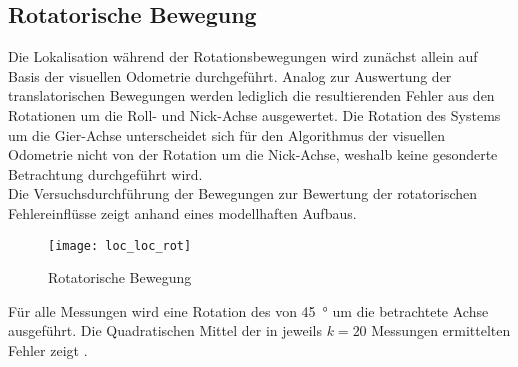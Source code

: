\subsection{Rotatorische Bewegung}

Die Lokalisation während der Rotationsbewegungen wird zunächst allein auf Basis der visuellen Odometrie durchgeführt. Analog zur Auswertung der translatorischen Bewegungen werden lediglich die resultierenden Fehler aus den Rotationen um die Roll- und Nick-Achse ausgewertet. Die Rotation des Systems um die Gier-Achse unterscheidet sich für den Algorithmus der visuellen Odometrie nicht von der Rotation um die Nick-Achse, weshalb keine gesonderte Betrachtung durchgeführt wird.\\
Die Versuchsdurchführung der Bewegungen zur Bewertung der rotatorischen Fehlereinflüsse zeigt  anhand eines modellhaften Aufbaus.\\


\begin{figure}[!ht]
	\begin{center}
		\texttt{[image: loc\_loc\_rot]}
		\caption{Rotatorische Bewegung}
		\label{fig.rotmove}
	\end{center}
\end{figure}


Für alle Messungen wird eine Rotation des  von \SI{45}{°} um die betrachtete Achse ausgeführt. Die Quadratischen Mittel der in jeweils $k=20$ Messungen ermittelten Fehler zeigt .

